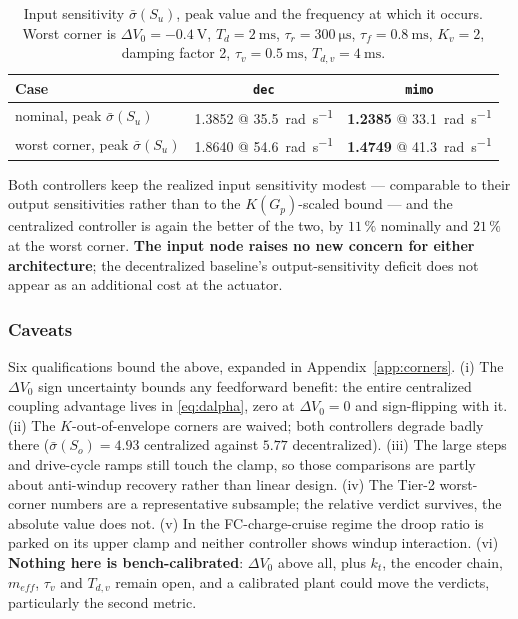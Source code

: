 \documentclass[energies,article,submit,pdftex,oneauthor]{Definitions/mdpi}
\begin{document}
\begin{table}[H]
\caption{Input sensitivity $\bar\sigma(S_u)$, peak value and the frequency at which it occurs.
Worst corner is $\Delta V_0 = \SI{-0.4}{\volt}$, $T_d = \SI{2}{\milli\second}$,
$\tau_r = \SI{300}{\micro\second}$, $\tau_f = \SI{0.8}{\milli\second}$, $K_v = 2$, damping
factor 2, $\tau_v = \SI{0.5}{\milli\second}$, $T_{d,v} = \SI{4}{\milli\second}$.}
\label{tab:su}
\begin{tabularx}{\textwidth}{XCC}
\toprule
\textbf{Case} & \texttt{dec} & \texttt{mimo} \\
\midrule
nominal, peak $\bar\sigma(S_u)$ & 1.3852 @ \SI{35.5}{\radian\per\second} & \textbf{1.2385} @ \SI{33.1}{\radian\per\second} \\
worst corner, peak $\bar\sigma(S_u)$ & 1.8640 @ \SI{54.6}{\radian\per\second} & \textbf{1.4749} @ \SI{41.3}{\radian\per\second} \\
\bottomrule
\end{tabularx}
\end{table}

Both controllers keep the realized input sensitivity modest --- comparable to their output
sensitivities rather than to the $K(G_p)$-scaled bound --- and the centralized controller is
again the better of the two, by $11\,\%$ nominally and $21\,\%$ at the worst corner. \textbf{The
input node raises no new concern for either architecture}; the decentralized baseline's
output-sensitivity deficit does not appear as an additional cost at the actuator.

\subsubsection{Caveats}
Six qualifications bound the above, expanded in Appendix~\ref{app:corners}. (i) The
$\Delta V_0$ sign uncertainty bounds any feedforward benefit: the entire centralized coupling
advantage lives in \eqref{eq:dalpha}, zero at $\Delta V_0 = 0$ and sign-flipping with it. (ii)
The $K$-out-of-envelope corners are waived; both controllers degrade badly there
($\bar\sigma(S_o) = 4.93$ centralized against $5.77$ decentralized). (iii)
The large steps and drive-cycle ramps still touch the clamp, so those comparisons are partly
about anti-windup recovery rather than linear design. (iv) The Tier-2 worst-corner numbers are a
representative subsample; the relative verdict survives, the absolute value does not. (v) In the
FC-charge-cruise regime the droop ratio is parked on its upper clamp and neither controller shows
windup interaction. (vi) \textbf{Nothing here is bench-calibrated}: $\Delta V_0$ above all,
plus $k_t$, the encoder chain, $m_{\!e\!f\!f}$, $\tau_v$ and $T_{d,v}$ remain open, and a
calibrated plant could move the verdicts, particularly the second metric.
\end{document}
